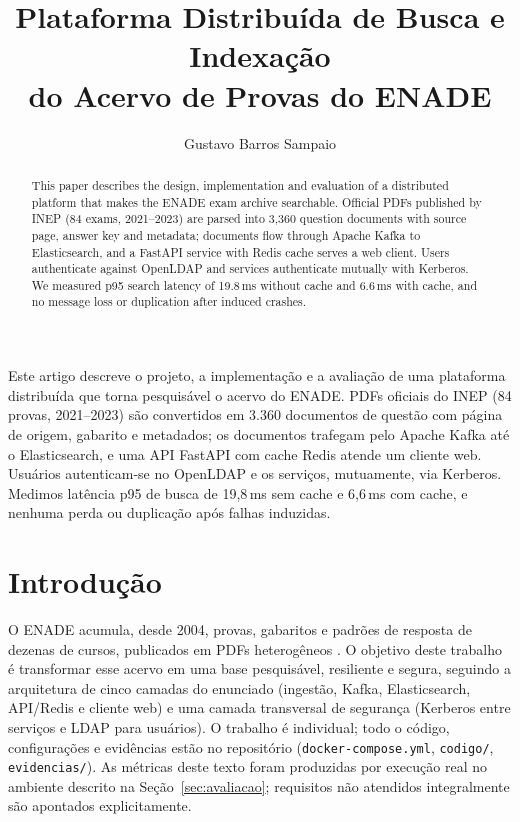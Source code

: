 \documentclass[12pt]{article}
\title{Plataforma Distribuída de Busca e Indexação\\ do Acervo de Provas do ENADE}
\author{Gustavo Barros Sampaio\inst{1}}
\newcommand{\cod}[1]{\texttt{\small #1}}
\begin{document}
\maketitle

\begin{abstract}
This paper describes the design, implementation and evaluation of a distributed platform that makes the
ENADE exam archive searchable. Official PDFs published by INEP (84 exams, 2021--2023) are parsed into 3,360
question documents with source page, answer key and metadata; documents flow through Apache Kafka to
Elasticsearch, and a FastAPI service with Redis cache serves a web client. Users authenticate against OpenLDAP
and services authenticate mutually with Kerberos. We measured p95 search latency of 19.8\,ms without cache
and 6.6\,ms with cache, and no message loss or duplication after induced crashes.
\end{abstract}

\begin{resumo}
Este artigo descreve o projeto, a implementação e a avaliação de uma plataforma distribuída que torna
pesquisável o acervo do ENADE. PDFs oficiais do INEP (84 provas, 2021--2023) são convertidos em 3.360
documentos de questão com página de origem, gabarito e metadados; os documentos trafegam pelo Apache Kafka até
o Elasticsearch, e uma API FastAPI com cache Redis atende um cliente web. Usuários autenticam-se no OpenLDAP e
os serviços, mutuamente, via Kerberos. Medimos latência p95 de busca de 19,8\,ms sem cache e 6,6\,ms com
cache, e nenhuma perda ou duplicação após falhas induzidas.
\end{resumo}

\section{Introdução}

O ENADE acumula, desde 2004, provas, gabaritos e padrões de resposta de dezenas de cursos, publicados em PDFs
heterogêneos \cite{inepprovas}. O objetivo deste trabalho é transformar esse acervo em uma base pesquisável,
resiliente e segura, seguindo a arquitetura de cinco camadas do enunciado (ingestão, Kafka, Elasticsearch,
API/Redis e cliente web) e uma camada transversal de segurança (Kerberos entre serviços e LDAP para usuários).
O trabalho é individual; todo o código, configurações e evidências estão no repositório
(\cod{docker-compose.yml}, \cod{codigo/}, \cod{evidencias/}). As métricas deste texto foram produzidas por
execução real no ambiente descrito na Seção~\ref{sec:avaliacao}; requisitos não atendidos integralmente são
apontados explicitamente.
\end{document}
